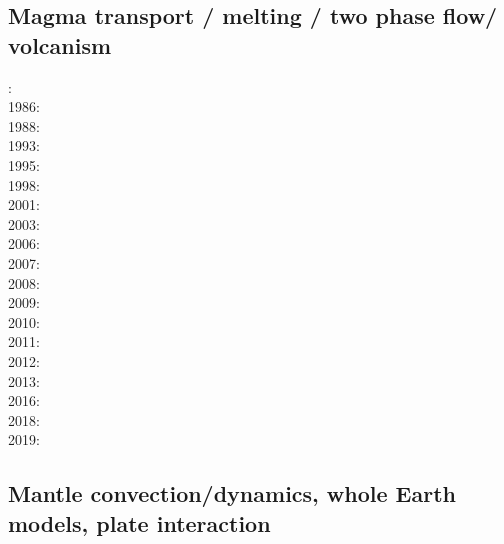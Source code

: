 \subsection*{Magma transport / melting / two phase flow/ volcanism}

: \cite{scst84}\cite{mcke84}\\
1986: \cite{scst86}\\
1988: \cite{scot88}\\
1993: \cite{spie93}\\
1995: \cite{bisc95}\\
1998: \cite{rabg98}\\
2001: \cite{bers01}\\
2003: \cite{beri03}\\
2006: \cite{omma06}\\
2007: \cite{srrb07}\cite{mohb07}\\
2008: \cite{hets08}\cite{hest08}\\
2009: \cite{bavi09}\\
2010: \cite{baiv10}\\
2011: \cite{baiv11}\cite{zhgy11}\cite{zhgh11}\\
2012: \cite{yatd12}\\
2013: \cite{kemk13}\cite{mofm13}\\
2016: \cite{keka16}\\
2018: \cite{lorg18}\\
2019: \cite{dagg19}


\subsection*{Mantle convection/dynamics, whole Earth models, plate interaction}

